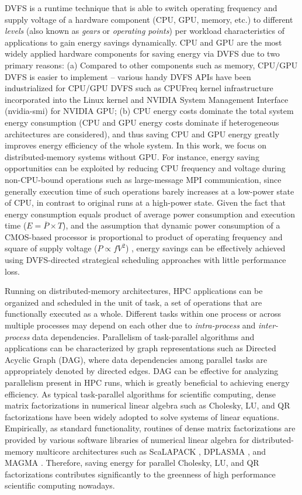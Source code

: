 \documentclass[12pt]{elsarticle}
\begin{document}
DVFS is a runtime technique that is able to switch operating frequency and supply voltage of a hardware component (CPU, GPU, memory, etc.) to different \emph{levels} (also known as \emph{gears} or \emph{operating points}) per workload characteristics of applications to gain energy savings dynamically. CPU and GPU are the most widely applied hardware components for saving energy via DVFS due to two primary reasons: (a) Compared to other components such as memory, CPU/GPU DVFS is easier to implement \cite{icac11} -- various handy DVFS APIs have been industrialized for CPU/GPU DVFS such as CPUFreq kernel infrastructure \cite{cpufreq} incorporated into the Linux kernel and NVIDIA System Management Interface (nvidia-smi) \cite{smi} for NVIDIA GPU; (b) CPU energy costs dominate the total system energy consumption \cite{tpds10} (CPU and GPU energy costs dominate if heterogeneous architectures are considered), and thus saving CPU and GPU energy greatly improves energy efficiency of the whole system. In this work, we focus on distributed-memory systems without GPU. For instance, energy saving opportunities can be exploited by reducing CPU frequency and voltage during non-CPU-bound operations such as large-message MPI communication, since generally execution time of such operations barely increases at a low-power state of CPU, in contrast to original runs at a high-power state. Given the fact that energy consumption equals product of average power consumption and execution time ($E = \overline{P} \times T$), and the assumption that dynamic power consumption of a CMOS-based processor is proportional to product of operating frequency and square of supply voltage ($P \propto fV^2$) \cite{ics02} \cite{sc05c}, energy savings can be effectively achieved using DVFS-directed strategical scheduling approaches with little performance loss.

Running on distributed-memory architectures, HPC applications can be organized and scheduled in the unit of task, a set of operations that are functionally executed as a whole. Different tasks within one process or across multiple processes may depend on each other due to \emph{intra-process} and \emph{inter-process} data dependencies. Parallelism of task-parallel algorithms and applications can be characterized by graph representations such as Directed Acyclic Graph (DAG), where data dependencies among parallel tasks are appropriately denoted by directed edges. DAG can be effective for analyzing parallelism present in HPC runs, which is greatly beneficial to achieving energy efficiency. As typical task-parallel algorithms for scientific computing, dense matrix factorizations in numerical linear algebra such as Cholesky, LU, and QR factorizations have been widely adopted to solve systems of linear equations. Empirically, as standard functionality, routines of dense matrix factorizations are provided by various software libraries of numerical linear algebra for distributed-memory multicore architectures such as ScaLAPACK \cite{scalapack}, DPLASMA \cite{dplasma}, and MAGMA \cite{magma}. Therefore, saving energy for parallel Cholesky, LU, and QR factorizations contributes significantly to the greenness of high performance scientific computing nowadays.
\end{document}
